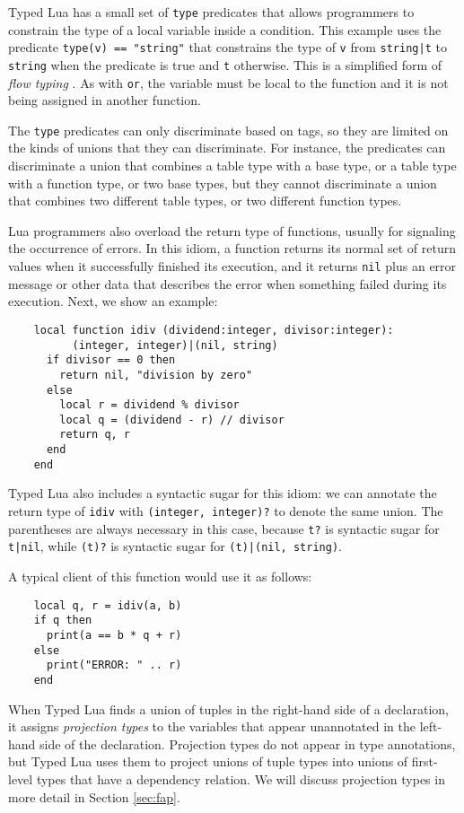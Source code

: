 Typed Lua has a small set of \texttt{type} predicates that allows
programmers to constrain the type of a local variable inside a condition.
This example uses the predicate \texttt{type(v) == "string"} that
constrains the type of \texttt{v} from \texttt{string|t} to
\texttt{string} when the predicate is true and \texttt{t} otherwise.
This is a simplified form of \emph{flow typing} \citep{guha2011tlc,tobin-hochstadt2010ltu}.
As with \texttt{or}, the variable must be local to the function
and it is not being assigned in another function.

The \texttt{type} predicates can only discriminate based on tags,
so they are limited on the kinds of unions that they can discriminate.
For instance, the predicates can discriminate a union that combines
a table type with a base type, or a table type with a function type,
or two base types, but they cannot discriminate a union that combines
two different table types, or two different function types.

Lua programmers also overload the return type of functions,
usually for signaling the occurrence of errors.
In this idiom, a function returns its normal set of return values
when it successfully finished its execution,
and it returns \texttt{nil} plus an error message or other data that
describes the error when something failed during its execution.
Next, we show an example:
\begin{verbatim}
    local function idiv (dividend:integer, divisor:integer):
          (integer, integer)|(nil, string)
      if divisor == 0 then
        return nil, "division by zero"
      else
        local r = dividend % divisor
        local q = (dividend - r) // divisor
        return q, r
      end 
    end
\end{verbatim}

Typed Lua also includes a syntactic sugar for this idiom:
we can annotate the return type of \texttt{idiv} with
\texttt{(integer, integer)?} to denote the same union.
The parentheses are always necessary in this case, because
\texttt{t?} is syntactic sugar for \texttt{t|nil},
while \texttt{(t)?} is syntactic sugar for \texttt{(t)|(nil, string)}.

A typical client of this function would use it as follows:
\begin{verbatim}
    local q, r = idiv(a, b)
    if q then
      print(a == b * q + r)
    else
      print("ERROR: " .. r)
    end
\end{verbatim}

When Typed Lua finds a union of tuples in the right-hand side of
a declaration, it assigns \emph{projection types} to the
variables that appear unannotated in the left-hand side of the
declaration.
Projection types do not appear in type annotations, but Typed Lua
uses them to project unions of tuple types into unions of
first-level types that have a dependency relation.
We will discuss projection types in more detail in Section \ref{sec:fap}.

